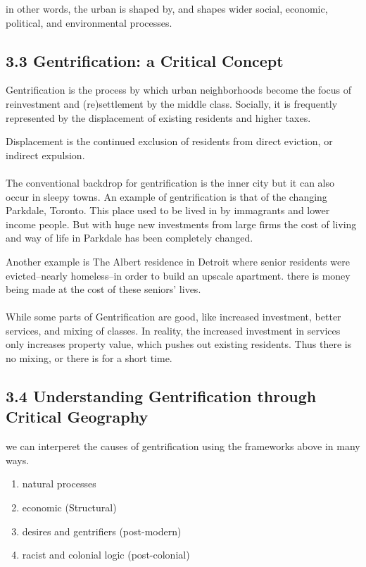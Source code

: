 \documentclass[12pt]{book}
\begin{document}
in other words, the urban is shaped by, and shapes wider social, economic, political, and environmental processes.


\subsection*{3.3 Gentrification: a Critical Concept}
Gentrification is the process by which urban neighborhoods become the focus of reinvestment and (re)settlement by 
        the middle class.
Socially, it is frequently represented by the displacement of existing residents  and higher taxes.

Displacement is the continued exclusion of residents from direct eviction, or indirect expulsion.

\paragraph{}
The conventional backdrop for gentrification is the inner city but it can also occur in sleepy towns.
An example of gentrification is that of the changing Parkdale, Toronto.
This place used to be lived in by immagrants and lower income people. But with huge new investments from large
        firms the cost of living and way of life in Parkdale has been completely changed.

Another example is The Albert residence in Detroit where senior residents were evicted--nearly homeless--in order
        to build an upscale apartment. there is money being made at the cost of these seniors' lives.

\paragraph{}
While some parts of Gentrification are good, like increased investment, better services, and mixing of classes.
In reality, the increased investment in services only increases property value, which pushes out existing residents.
Thus there is no mixing, or there is for a short time.

\subsection*{3.4 Understanding Gentrification through Critical Geography}
we can interperet the causes of gentrification using the frameworks above in many ways.
\begin{enumerate}
        \item natural processes
        \item economic (Structural)
        \item desires and gentrifiers (post-modern)
        \item racist and colonial logic (post-colonial)
\end{enumerate}
\end{document}
